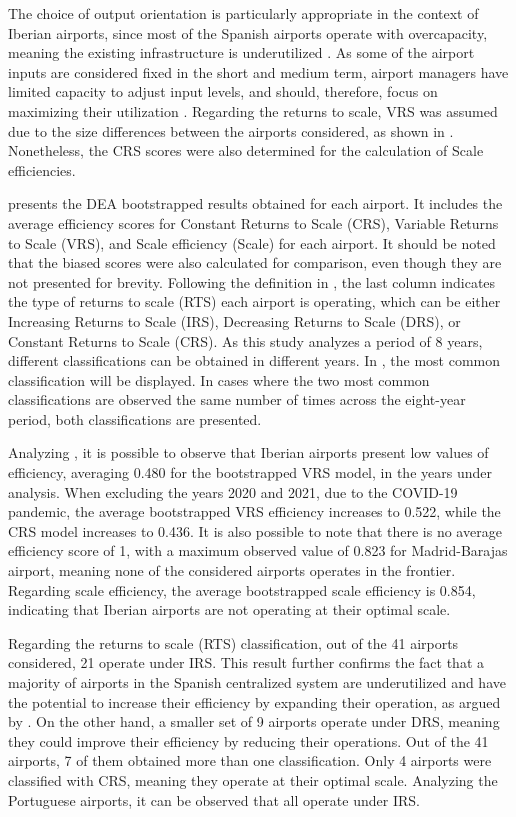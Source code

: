 The choice of output orientation is particularly appropriate in the context of Iberian airports, since
most of the Spanish airports operate with overcapacity, meaning the existing infrastructure is underutilized \cite{nerja2021}. As some of the airport inputs are considered fixed in the short and medium term, airport managers have limited capacity to adjust input levels,
and should, therefore, focus on maximizing their utilization \cite{martin2001}. Regarding the returns to scale, VRS was assumed due to the size differences between the airports considered, as shown in . Nonetheless, the CRS
scores were also determined for the calculation of Scale efficiencies. 

 presents the DEA bootstrapped results obtained for each airport. It includes the average efficiency scores for Constant Returns to Scale (CRS), Variable Returns to Scale (VRS), and Scale efficiency (Scale) for each airport. It should be noted that the biased scores were also calculated for comparison, even though they are not presented for brevity. Following the definition in , the last column indicates the type of returns to scale (RTS) each airport is operating, which can
be either Increasing Returns to Scale (IRS), Decreasing Returns to Scale (DRS), or Constant Returns to Scale (CRS). As this study analyzes a period of 8 years, different classifications can be obtained in
different years. In , the most common classification will be displayed. In cases where the two
most common classifications are observed the same number of times across the eight-year period, both
classifications are presented.

Analyzing , it is possible to observe that Iberian airports present low values of efficiency,
averaging 0.480 for the bootstrapped VRS model, in the years under
analysis.
When excluding the years 2020 and 2021, due to the COVID-19 pandemic, the average
bootstrapped VRS efficiency increases to 0.522, while the CRS model increases to 0.436. It is also
possible to note that there is no average efficiency score of 1, with a maximum observed
value of 0.823 for Madrid-Barajas airport, meaning none of the considered airports operates in the
frontier. Regarding scale efficiency, the average bootstrapped scale efficiency is 0.854, indicating that
Iberian airports are not operating at their optimal scale.

Regarding the returns to scale (RTS) classification, out of the 41 airports considered, 21 operate
under IRS. This result further confirms the fact that a majority of airports in the Spanish centralized
system are underutilized and have the potential to increase their efficiency by expanding their operation,
as argued by \cite{nerja2021}. On the other hand, a smaller set of 9 airports operate under DRS, meaning
they could improve their efficiency by reducing their operations. Out of the 41 airports, 7 of them obtained
more than one classification. Only 4 airports were classified
with CRS, meaning they operate at their optimal scale. Analyzing the Portuguese airports, it can be
observed that all operate under IRS. 

